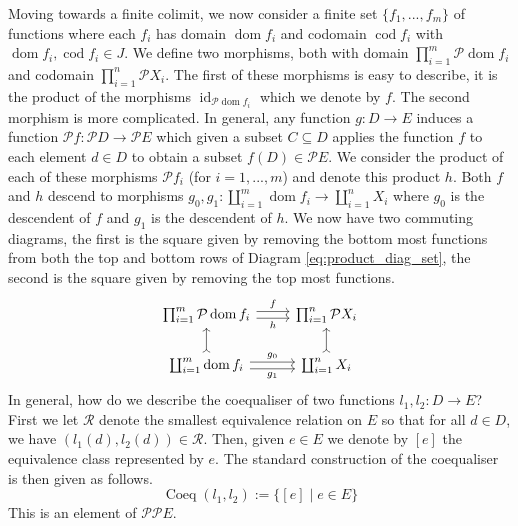 \documentclass{tac}
\newcommand{\call}[1]{\mathcal{#1}}
\newcommand{\lto}{\longrightarrow}
\begin{document}
	Moving towards a finite colimit, we now consider a finite set $\lbrace f_1,...,f_m\rbrace$ of functions where each $f_i$ has domain $\operatorname{dom}f_i$ and codomain $\operatorname{cod}f_i$ with $\operatorname{dom}f_i, \operatorname{cod}f_i \in J$. We define two morphisms, both with domain $\prod_{i = 1}^m \call{P}\operatorname{dom}f_i$ and codomain $\prod_{i = 1}^n \call{P}X_i$. The first of these morphisms is easy to describe, it is the product of the morphisms $\operatorname{id}_{\call{P}\operatorname{dom}f_i}$ which we denote by $f$. The second morphism is more complicated. In general, any function $g: D \lto E$ induces a function $\call{P}f: \call{P}D \lto \call{P}E$ which given a subset $C \subseteq D$ applies the function $f$ to each element $d \in D$ to obtain a subset $f(D) \in \call{P}E$. We consider the product of each of these morphisms $\call{P} f_i$ (for $i = 1,...,m$) and denote this product $h$.  Both $f$ and $h$ descend to morphisms $g_0,g_1: \coprod_{i = 1}^m \operatorname{dom}f_i\lto \coprod_{i = 1}^n X_i$ where $g_0$ is the descendent of $f$ and $g_1$ is the descendent of $h$. We now have two commuting diagrams, the first is the square given by removing the bottom most functions from both the top and bottom rows of Diagram \ref{eq:product_diag_set}, the second is the square given by removing the top most functions.
	\begin{equation}\label{eq:product_diag_set}
		\begin{tikzcd}
			\prod_{i = 1}^m \call{P}\operatorname{dom}f_i\arrow[r,shift left, "{f}"]\arrow[r,shift right, swap, "{h}"] & \prod_{i  =1}^n \call{P} X_i\\
			\coprod_{i = 1}^m \operatorname{dom}f_i\arrow[r,shift left, "{g_0}"]\arrow[r,shift right, swap, "{g_1}"]\arrow[u,rightarrowtail] & \coprod_{i = 1}^n X_i\arrow[u,rightarrowtail]
		\end{tikzcd}
	\end{equation}
	In general, how do we describe the coequaliser of two functions $l_1,l_2: D \lto E$? First we let $\call{R}$ denote the smallest equivalence relation on $E$ so that for all $d \in D$, we have $(l_1(d),l_2(d)) \in \call{R}$. Then, given $e \in E$ we denote by $[e]$ the equivalence class represented by $e$. The standard construction of the coequaliser is then given as follows.
	\begin{equation}
		\operatorname{Coeq}(l_1,l_2) := \lbrace [e] \mid e \in E\rbrace
	\end{equation}
	This is an element of $\call{P}\call{P}E$.
	
\end{document}
